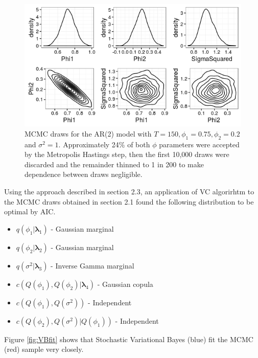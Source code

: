 \documentclass[12pt,a4paper]{article}%
\numberwithin{equation}{section}
\begin{document}
\begin{figure}[h]
\centering
\includegraphics[scale = 0.6]{MCMC.png}
\caption{MCMC draws for the AR(2) model with $T = 150, \phi_1 = 0.75, \phi_2 = 0.2$ and $\sigma^2 = 1$. Approximately 24\% of both $\phi$ parameters were accepted by the Metropolis Hastings step, then the first 10,000 draws were discarded and the remainder thinned to 1 in 200 to make dependence between draws negligible.}
\label{fig:MCMCplot}
\end{figure}





Using the approach described in section 2.3, an application of VC algorirhtm to the MCMC draws obtained in section 2.1 found the following distribution to be optimal by AIC.

\begin{itemize}
\item $q(\phi_1 | \boldsymbol{\lambda}_1)$ - Gaussian marginal
\item $q(\phi_2| \boldsymbol{\lambda}_2)$ - Gaussian marginal
\item $q(\sigma^2| \boldsymbol{\lambda}_3)$ - Inverse Gamma marginal
\item $c(Q(\phi_1), Q(\phi_2) | \boldsymbol{\lambda}_4)$ - Gaussian copula
\item $c(Q(\phi_1), Q(\sigma^2))$ - Independent
\item $c(Q(\phi_2), Q(\sigma^2) | Q(\phi_1))$ - Independent
\end{itemize}

Figure \ref{fig:VBfit} shows that Stochastic Variational Bayes (blue) fit the MCMC (red) sample very closely.
\end{document}
